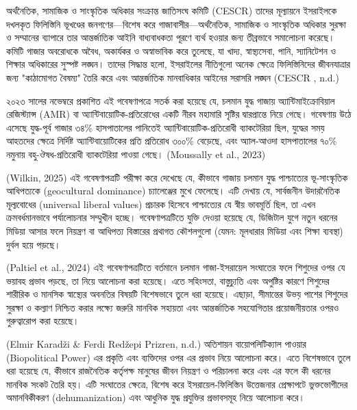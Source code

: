 অর্থনৈতিক, সামাজিক ও সাংস্কৃতিক অধিকার সংক্রান্ত জাতিসংঘ কমিটি (CESCR) তাদের মূল্যায়নে ইসরাইলকে দখলকৃত ফিলিস্তিনি ভূখণ্ডের জনগণের---বিশেষ করে গাজাবাসীর---অর্থনৈতিক, সামাজিক ও সাংস্কৃতিক অধিকার সুরক্ষা ও সম্মানের ব্যাপারে তার আন্তর্জাতিক আইনি বাধ্যবাধকতা পূরণে ব্যর্থ হওয়ার জন্য তীব্রভাবে সমালোচনা করেছে। কমিটি গাজার অবরোধকে অবৈধ, অকার্যকর ও অস্বাভাবিক করে তুলেছে, যা খাদ্য, স্বাস্থ্যসেবা, পানি, স্যানিটেশন ও শিক্ষার অধিকারের সুস্পষ্ট লঙ্ঘন। তাদের সিদ্ধান্ত হলো, ইসরাইলের নীতিগুলো অনেক ক্ষেত্রে ফিলিস্তিনিদের জীবনযাত্রার জন্য "কাঠামোগত বৈষম্য" তৈরি করে এবং আন্তর্জাতিক মানবাধিকার আইনের সরাসরি লঙ্ঘন (CESCR , n.d.)

২০২৩ সালের নভেম্বরে প্রকাশিত এই গবেষণাপত্রে সতর্ক করা হয়েছে যে, চলমান যুদ্ধ গাজায় অ্যান্টিমাইক্রোবিয়াল রেজিস্ট্যান্স (AMR) বা অ্যান্টিবায়োটিক-প্রতিরোধের একটি নীরব মহামারি সৃষ্টির দ্বারপ্রান্তে নিয়ে গেছে। গবেষণায় উঠে এসেছে যুদ্ধ-পূর্ব গাজার ৩৪\% হাসপাতালের পানিতেই অ্যান্টিবায়োটিক-প্রতিরোধী ব্যাকটেরিয়া ছিল, যুদ্ধের সময় আহতদের ক্ষেত্রে নির্দিষ্ট অ্যান্টিবায়োটিকের প্রতি প্রতিরোধ ৩০০\% বেড়েছে, এবং অ্যাল-আওদা হাসপাতালের ৭০\% নমুনায় বহু-ঔষধ-প্রতিরোধী ব্যাকটেরিয়া পাওয়া গেছে। (Moussally et al., 2023)

(Wilkin, 2025) এই গবেষণাপত্রটি পরীক্ষা করে দেখেছে যে, কীভাবে গাজায় চলমান যুদ্ধ পাশ্চাত্যের ভূ-সাংস্কৃতিক আধিপত্যকে (geocultural dominance) চ্যালেঞ্জের মুখে ফেলেছে। এটি দেখায় যে, সার্বজনীন উদারনৈতিক মূল্যবোধের (universal liberal values) প্রচারক হিসেবে পাশ্চাত্যের যে স্বীয় ভাবমূর্তি ছিল, তা এখন ক্রমবর্ধমানভাবে পর্যালোচনার সম্মুখীন হচ্ছে। গবেষণাপত্রটিতে যুক্তি দেওয়া হয়েছে যে, ডিজিটাল যুগে নতুন ধরনের মিডিয়া আসার ফলে নিয়ন্ত্রণ বা আধিপত্য বিস্তারের প্রথাগত কৌশলগুলো (যেমন: মূলধারার মিডিয়া এবং শিক্ষা ব্যবস্থা) দুর্বল হয়ে পড়ছে।

(Paltiel et al., 2024) এই গবেষণাপত্রটিতে বর্তমানে চলমান গাজা-ইসরায়েল সংঘাতের ফলে শিশুদের ওপর যে ভয়াবহ প্রভাব পড়ছে, তা নিয়ে আলোচনা করা হয়েছে। এতে সহিংসতা, বাস্তুচ্যুতি এবং অপুষ্টির কারণে শিশুদের শারীরিক ও মানসিক স্বাস্থ্যের অবনতির বিষয়টি বিশেষভাবে তুলে ধরা হয়েছে। এছাড়া, সীমান্তের উভয় পাশের শিশুদের সুরক্ষা ও কল্যাণ নিশ্চিত করার লক্ষ্যে জরুরি মানবিক সহায়তা এবং আন্তর্জাতিক সহযোগিতার প্রয়োজনীয়তার ওপরও গুরুত্বারোপ করা হয়েছে।

(Elmir Karadži \& Ferdi Redžepi Prizren, n.d.) অতিশায়ন বায়োপলিটিক্যাল পাওয়ার (Biopolitical Power) এর প্রকৃতি এবং ব্যক্তিদের ওপর এর প্রভাব নিয়ে আলোচনা করে। এতে বিশেষভাবে তুলে ধরা হয়েছে যে, কীভাবে রাজনৈতিক কর্তৃপক্ষ মানুষের জীবন নিয়ন্ত্রণ ও পরিচালনা করে এবং এর ফলে কী ধরনের মানবিক সংকট তৈরি হয়। এটি সংঘাতের ক্ষেত্রে, বিশেষ করে ইসরায়েল-ফিলিস্তিন উত্তেজনার প্রেক্ষাপটে ভুক্তভোগীদের \textquotesingle অমানবিকীকরণ\textquotesingle{} (dehumanization) এবং আধুনিক যুদ্ধ প্রযুক্তির প্রভাবসমূহ নিয়ে আলোচনা করে।

